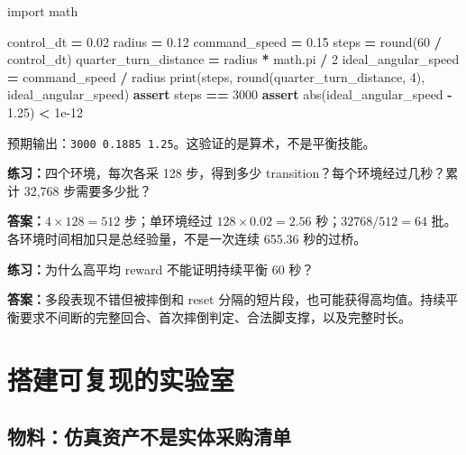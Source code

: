 \documentclass[
  chinese,
  11pt,
  letterpaper,
]{article}
\newenvironment{Shaded}{\begin{snugshade}}{\end{snugshade}}
\newcommand{\BuiltInTok}[1]{#1}
\newcommand{\ControlFlowTok}[1]{\textcolor[rgb]{0.13,0.29,0.53}{\textbf{#1}}}
\newcommand{\DecValTok}[1]{\textcolor[rgb]{0.00,0.00,0.81}{#1}}
\newcommand{\FloatTok}[1]{\textcolor[rgb]{0.00,0.00,0.81}{#1}}
\newcommand{\ImportTok}[1]{#1}
\newcommand{\NormalTok}[1]{#1}
\newcommand{\OperatorTok}[1]{\textcolor[rgb]{0.81,0.36,0.00}{\textbf{#1}}}
\renewenvironment{Shaded}{\par\smallskip}{\par\smallskip}
\begin{document}
\begin{Shaded}
\begin{Highlighting}[]
\ImportTok{import}\NormalTok{ math}

\NormalTok{control\_dt }\OperatorTok{=} \FloatTok{0.02}
\NormalTok{radius }\OperatorTok{=} \FloatTok{0.12}
\NormalTok{command\_speed }\OperatorTok{=} \FloatTok{0.15}
\NormalTok{steps }\OperatorTok{=} \BuiltInTok{round}\NormalTok{(}\DecValTok{60} \OperatorTok{/}\NormalTok{ control\_dt)}
\NormalTok{quarter\_turn\_distance }\OperatorTok{=}\NormalTok{ radius }\OperatorTok{*}\NormalTok{ math.pi }\OperatorTok{/} \DecValTok{2}
\NormalTok{ideal\_angular\_speed }\OperatorTok{=}\NormalTok{ command\_speed }\OperatorTok{/}\NormalTok{ radius}
\BuiltInTok{print}\NormalTok{(steps, }\BuiltInTok{round}\NormalTok{(quarter\_turn\_distance, }\DecValTok{4}\NormalTok{), ideal\_angular\_speed)}
\ControlFlowTok{assert}\NormalTok{ steps }\OperatorTok{==} \DecValTok{3000}
\ControlFlowTok{assert} \BuiltInTok{abs}\NormalTok{(ideal\_angular\_speed }\OperatorTok{{-}} \FloatTok{1.25}\NormalTok{) }\OperatorTok{\textless{}} \FloatTok{1e{-}12}
\end{Highlighting}
\end{Shaded}

预期输出：\texttt{3000\ 0.1885\ 1.25}。这验证的是算术，不是平衡技能。

\textbf{练习：}四个环境，每次各采 128 步，得到多少
transition？每个环境经过几秒？累计 32,768 步需要多少批？

\textbf{答案：}\(4\times128=512\) 步；单环境经过 \(128\times0.02=2.56\)
秒；\(32768/512=64\) 批。各环境时间相加只是总经验量，不是一次连续 655.36
秒的过桥。

\textbf{练习：}为什么高平均 reward 不能证明持续平衡 60 秒？

\textbf{答案：}多段表现不错但被摔倒和 reset
分隔的短片段，也可能获得高均值。持续平衡要求不间断的完整回合、首次摔倒判定、合法脚支撑，以及完整时长。

\section{搭建可复现的实验室}\label{ux642dux5efaux53efux590dux73b0ux7684ux5b9eux9a8cux5ba4}

\subsection{物料：仿真资产不是实体采购清单}\label{ux7269ux6599ux4effux771fux8d44ux4ea7ux4e0dux662fux5b9eux4f53ux91c7ux8d2dux6e05ux5355}
\end{document}
